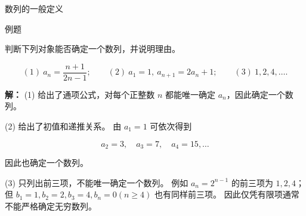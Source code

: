 \documentclass[aspectratio=169,10pt,fontset=fandol]{ctexbeamer}
\begin{document}
\begin{frame}[t,fragile]{数列的一般定义}
\normalsize
\begin{block}{例题}
{\normalsize
判断下列对象能否确定一个数列，并说明理由。

\[

(1)\ a_n=\frac{n+1}{2n-1};\qquad

(2)\ a_1=1,\ a_{n+1}=2a_n+1;\qquad

(3)\ 1,2,4,\ldots .

\]


}
\end{block}
\pause
{\normalsize
\textbf{解：}
(1) 给出了通项公式，对每个正整数 $n$ 都能唯一确定 $a_n$，因此确定一个数列。



(2) 给出了初值和递推关系。 由 $a_1=1$ 可依次得到

\[

a_2=3,\quad a_3=7,\quad a_4=15,\ldots

\]

因此也确定一个数列。



(3) 只列出前三项，不能唯一确定一个数列。 例如 $a_n=2^{n-1}$ 的前三项为 $1,2,4$；但 $b_1=1,b_2=2,b_3=4,b_n=0(n\ge4)$ 也有同样前三项。 因此仅凭有限项通常不能严格确定无穷数列。


}
\end{frame}
\end{document}
